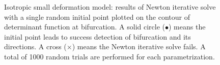 \documentclass[12pt]{article}
\numberwithin{equation}{section}
\begin{document}
\begin{figure}[H]
   \centering {}   
   \caption{Isotropic small deformation model: results of Newton 
   iterative solve with a single random initial point plotted on the 
   contour of determinant function at bifurcation. A solid circle 
   ($\bullet$) means the initial point leads to success detection of 
   bifurcation and its directions. A cross ($\times$) means the Newton 
   iterative solve fails. A total of 1000 random trials are performed 
   for each parametrization.}
   \label{fig:iso_shear_robust}
\end{figure}
\end{document}
